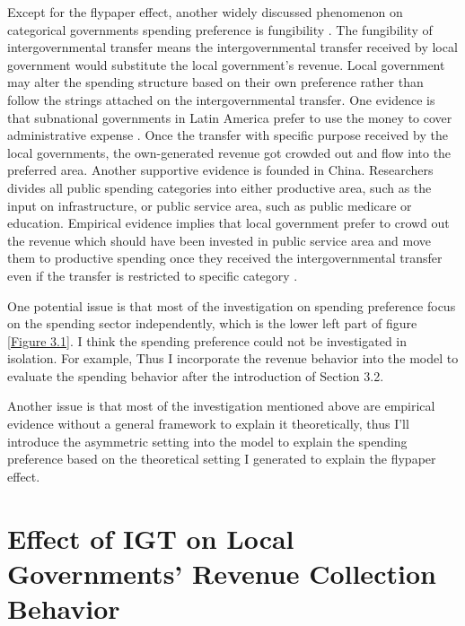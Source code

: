 Except for the flypaper effect, another widely discussed phenomenon on categorical governments spending preference is fungibility \cite{pack1993foreign}. The fungibility of intergovernmental transfer means the intergovernmental transfer received by local government would substitute the local government's revenue. Local government may alter the spending structure based on their own preference rather than follow the strings attached on the intergovernmental transfer. One evidence is that subnational governments in Latin America prefer to use the money to cover administrative expense \cite{stein1999fiscal}. Once the transfer with specific purpose received by the local governments, the own-generated revenue got crowded out and flow into the preferred area. Another supportive evidence is founded in China. Researchers divides all public spending categories into either productive area, such as the input on infrastructure, or public service area, such as public medicare or education. Empirical evidence implies that local government prefer to crowd out the revenue which should have been invested in public service area and move them to productive spending once they received the intergovernmental transfer even if the transfer is restricted to specific category \cite{yinheng2011,fuyong2010}.

One potential issue is that most of the investigation on spending preference focus on the spending sector independently, which is the lower left part of figure \ref{Figure 3.1}. I think the spending preference could not be investigated in isolation. For example,  Thus I incorporate the revenue behavior into the model to evaluate the spending behavior after the introduction of Section 3.2.

Another issue is that most of the investigation mentioned above are empirical evidence without a general framework to explain it theoretically, thus I'll introduce the asymmetric setting into the model to explain the spending preference based on the theoretical setting I generated to explain the flypaper effect.

\section{Effect of IGT on Local Governments' Revenue Collection Behavior}

